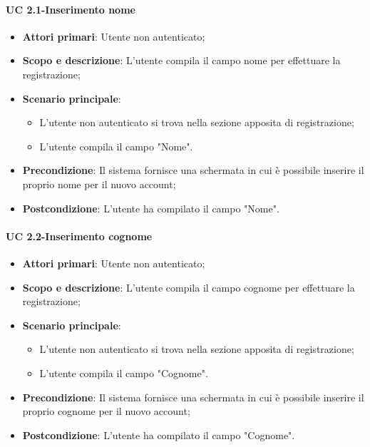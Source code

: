             \paragraph{UC 2.1-Inserimento nome}
                \begin{itemize}
                \item \textbf{Attori primari}: Utente non autenticato;
                
                \item \textbf{Scopo e descrizione}: L'utente compila il campo nome per effettuare la registrazione; 
                \item \textbf{Scenario principale}: 
                    \begin{itemize}
                        \item L'utente non autenticato si trova nella sezione apposita di registrazione;
                        \item L'utente compila il campo "Nome".
                    \end{itemize}
                \item \textbf{Precondizione}: Il sistema fornisce una schermata in cui è possibile inserire il proprio nome per il nuovo account;
                \item \textbf{Postcondizione}: L'utente ha compilato il campo "Nome".
                \end{itemize}
                
                
            \paragraph{UC 2.2-Inserimento cognome}
                \begin{itemize}
                \item \textbf{Attori primari}: Utente non autenticato;
                
                \item \textbf{Scopo e descrizione}: L'utente compila il campo cognome per effettuare la registrazione; 
                \item \textbf{Scenario principale}: 
                    \begin{itemize}
                        \item L'utente non autenticato si trova nella sezione apposita di registrazione;
                        \item L'utente compila il campo "Cognome".
                    \end{itemize}
                \item \textbf{Precondizione}: Il sistema fornisce una schermata in cui è possibile inserire il proprio cognome per il nuovo account;
                \item \textbf{Postcondizione}: L'utente ha compilato il campo "Cognome".
                \end{itemize}
                
